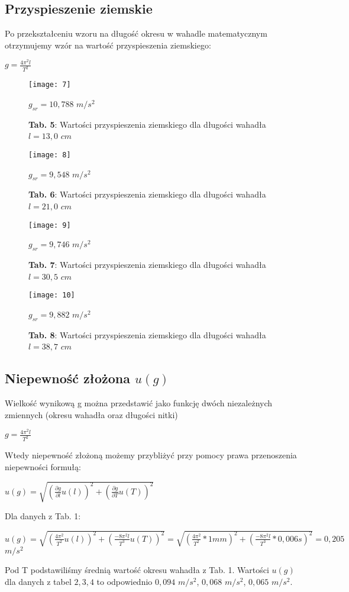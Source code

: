 \documentclass[12pt]{article}
\begin{document}
\subsection{Przyspieszenie ziemskie}
Po przekształceniu wzoru na długość okresu w wahadle matematycznym otrzymujemy wzór na wartość przyspieszenia ziemskiego: 
\begin{center}
\LARGE $ g = \frac{4{\pi^2}l}{T^2} $
\end{center}
\begin{figure}[H]
\centering
\texttt{[image: 7]}
\caption*{\textbf{Tab. 5}: Wartości przyspieszenia ziemskiego dla długości wahadła $l = 13,0$ $cm$}
$ g_{sr} = 10,788 $ $m/s^2 $
\end{figure}
\begin{figure}[H]
\centering
\texttt{[image: 8]}
\caption*{\textbf{Tab. 6}: Wartości przyspieszenia ziemskiego dla długości wahadła $l = 21,0$ $cm$}
$ g_{sr} = 9,548 $ $m/s^2 $
\end{figure}
\begin{figure}[H]
\centering
\texttt{[image: 9]}
\caption*{\textbf{Tab. 7}: Wartości przyspieszenia ziemskiego dla długości wahadła $l = 30,5$ $cm$}
$ g_{sr} = 9,746 $ $m/s^2 $
\end{figure}
\begin{figure}[H]
\centering
\texttt{[image: 10]}
\caption*{\textbf{Tab. 8}: Wartości przyspieszenia ziemskiego dla długości wahadła $l = 38,7$ $cm$}
$ g_{sr} = 9,882 $ $m/s^2 $
\end{figure}
\subsection{Niepewność złożona $u(g)$}
Wielkość wynikową g można przedstawić jako funkcję dwóch niezależnych zmiennych (okresu wahadła oraz długości nitki) 
\begin{center}
\LARGE $ g = \frac{4{\pi^2}l}{T^2} $
\end{center}
Wtedy niepewność złożoną możemy przybliżyć przy pomocy prawa przenoszenia niepewności formułą:
\begin{center}
\LARGE $ u(g) = \sqrt{(\frac{\partial{g}}{\partial{l}}u(l))^2+(\frac{\partial{g}}{\partial{T}}u(T))^2}$
\end{center}
Dla danych z Tab. 1:
\begin{center}
\LARGE $ u(g) = \sqrt{(\frac{4\pi^2}{T^2}u(l))^2+(\frac{-8\pi^2l}{T^3}u(T))^2} = \sqrt{(\frac{4\pi^2}{T^2}*1mm)^2+(\frac{-8\pi^2l}{T^3}*0,006s)^2} = 0,205 $ $ m/s^2 $
\end{center}
Pod T podstawiliśmy średnią wartość okresu wahadła z Tab. 1. \newline
Wartości $u(g)$ dla danych z tabel $2,3,4$ to odpowiednio $0,094$ $m/s^2$, $0,068$ $m/s^2$, $0,065$ $m/s^2$.
\end{document}
